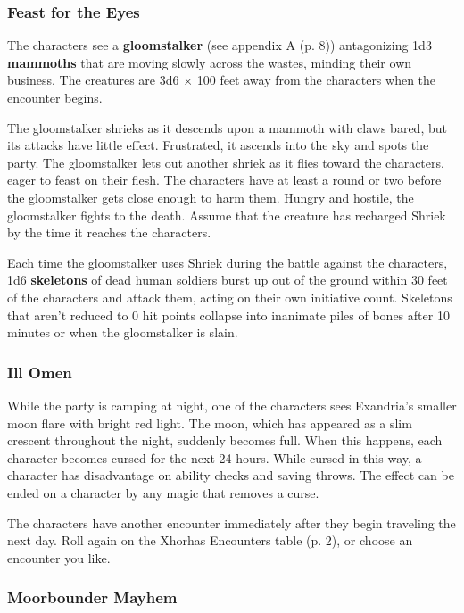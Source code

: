 \documentclass[a4paper, 11pt, bg=full, twocolumn, nooutline]{dndbook}
\begin{document}
\subsubsection{Feast for the Eyes}

The characters see a \textbf{gloomstalker} (see appendix A (p. 8)) antagonizing 1d3 \textbf{mammoths} that are moving slowly across the wastes, minding their own business. The creatures are 3d6 × 100 feet away from the characters when the encounter begins.

The gloomstalker shrieks as it descends upon a mammoth with claws bared, but its attacks have little effect. Frustrated, it ascends into the sky and spots the party. The gloomstalker lets out another shriek as it flies toward the characters, eager to feast on their flesh. The characters have at least a round or two before the gloomstalker gets close enough to harm them. Hungry and hostile, the gloomstalker fights to the death. Assume that the creature has recharged Shriek by the time it reaches the characters.

Each time the gloomstalker uses Shriek during the battle against the characters, 1d6 \textbf{skeletons} of dead human soldiers burst up out of the ground within 30 feet of the characters and attack them, acting on their own initiative count. Skeletons that aren't reduced to 0 hit points collapse into inanimate piles of bones after 10 minutes or when the gloomstalker is slain.

\subsubsection{Ill Omen}

While the party is camping at night, one of the characters sees Exandria's smaller moon flare with bright red light. The moon, which has appeared as a slim crescent throughout the night, suddenly becomes full. When this happens, each character becomes cursed for the next 24 hours. While cursed in this way, a character has disadvantage on ability checks and saving throws. The effect can be ended on a character by any magic that removes a curse.

The characters have another encounter immediately after they begin traveling the next day. Roll again on the Xhorhas Encounters table (p. 2), or choose an encounter you like.

\subsubsection{Moorbounder Mayhem}
\end{document}
